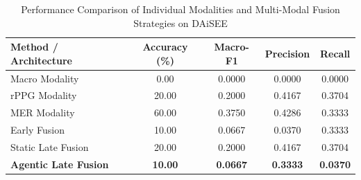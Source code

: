 \begin{table}[htbp]
\centering
\caption{Performance Comparison of Individual Modalities and Multi-Modal Fusion Strategies on DAiSEE}
\label{tab:engagement_results}
\begin{tabular}{lcccc}
\hline
\textbf{Method / Architecture} & \textbf{Accuracy (\%)} & \textbf{Macro-F1} & \textbf{Precision} & \textbf{Recall} \\
\hline
Macro Modality & 0.00 & 0.0000 & 0.0000 & 0.0000 \\
rPPG Modality & 20.00 & 0.2000 & 0.4167 & 0.3704 \\
MER Modality & 60.00 & 0.3750 & 0.4286 & 0.3333 \\
Early Fusion & 10.00 & 0.0667 & 0.0370 & 0.3333 \\
Static Late Fusion & 20.00 & 0.2000 & 0.4167 & 0.3704 \\
\textbf{Agentic Late Fusion} & \textbf{10.00} & \textbf{0.0667} & \textbf{0.3333} & \textbf{0.0370} \\
\hline
\end{tabular}
\end{table}
